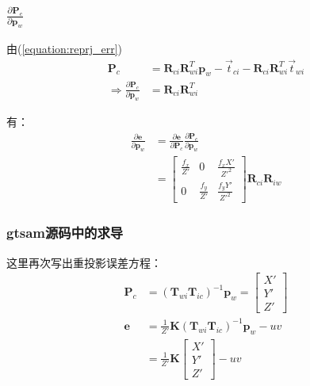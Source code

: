 \documentclass{article}
\begin{document}
\subsubsection{$\frac{\partial{\boldsymbol{P}_c}}{\partial{\boldsymbol{p}_w}}$}
由(\ref{equation:reprj_err})
$$
\begin{aligned}
	\boldsymbol{P}_c                                                          & =                                        
	\boldsymbol{R}_{ci}\boldsymbol{R}_{wi}^T\boldsymbol{p}_w  -\vec{t}_{ci}-\boldsymbol{R}_{ci}\boldsymbol{R}_{wi}^T\vec{t}_{wi} 
	\\
	\Rightarrow \frac{\partial{\boldsymbol{P}_c}}{\partial{\boldsymbol{p}_w}} & = \boldsymbol{R}_{ci}\boldsymbol{R}_{wi}^T
\end{aligned}
$$

有：
\begin{equation}
	\begin{aligned}
		\frac{\partial{\boldsymbol{e}}}{\partial{\boldsymbol{p}_w}} & = \frac{\partial{\boldsymbol{e}}}{\partial{\boldsymbol{P}_c}}  \frac{\partial{\boldsymbol{P}_c}}{\partial{\boldsymbol{p}_w}} 
		\\& = 
		\left[ 
		\begin{matrix}
		\frac{f_x}{Z'} & 0              & \frac{f_xX'}{Z'^2} \\
		0              & \frac{f_y}{Z'} & \frac{f_yY'}{Z'^2} 
		\end{matrix}
		\right]
		\boldsymbol{R}_{ci}\boldsymbol{R}_{iw} 
	\end{aligned}
\end{equation}

\subsubsection{gtsam源码中的求导}
这里再次写出重投影误差方程：
$$
\begin{aligned}
	\boldsymbol{P}_c & =(\boldsymbol{T}_{wi} \boldsymbol{T}_{ic})^{-1} \boldsymbol{p}_w  =                              
	\left[
	\begin{matrix}
	X'\\
	Y'\\
	Z' 
	\end{matrix}
	\right] \\
	\boldsymbol {e}  & =\frac{1}{Z'}\boldsymbol{K} (\boldsymbol{T}_{wi} \boldsymbol{T}_{ic})^{-1} \boldsymbol{p}_w  -uv 
	\\&=
	\frac{1}{Z'}\boldsymbol{K}
	\left[
	\begin{matrix}
	X'\\
	Y'\\
	Z' 
	\end{matrix}
	\right]-uv
\end{aligned}
$$
\end{document}
